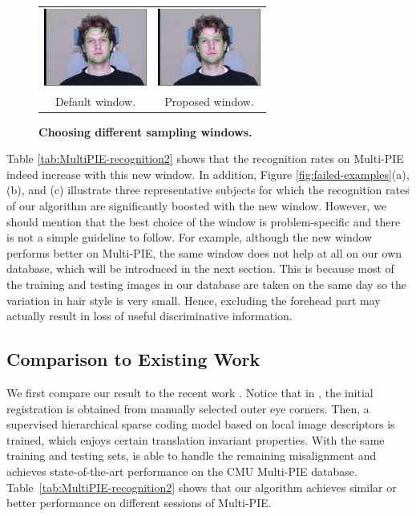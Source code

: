 \documentclass[10pt,journal,letterpaper,compsoc]{IEEEtran} %
\begin{document}
\begin{figure}
\vspace{-1em}
\centering
{\small
\begin{tabular}{@{}cc@{}}
\includegraphics[trim=1.9in .7in 1.9in .5in, clip, height=1.0in]{figures_pami/example.png} &
\includegraphics[trim=1.9in .7in 1.9in .5in, clip, height=1.0in]{figures_pami/example_new.png} \vspace{0mm} \\
Default window. & Proposed window. \vspace{0mm}
\end{tabular}
}
\caption{{\bf Choosing different sampling windows.}}
\label{fig:new-mask}
\vspace{-1em}
\end{figure}

Table \ref{tab:MultiPIE-recognition2} shows that the
recognition rates on Multi-PIE indeed increase with this new
window. In addition, Figure \ref{fig:failed-examples}(a), (b),
and (c) illustrate three representative subjects for which the
recognition rates of our algorithm are significantly boosted
with the new window. However, we should mention that the best
choice of the window is problem-specific and there is not a
simple guideline to follow. For example, although the new
window performs better on Multi-PIE, the same window does not
help at all on our own database, which will be introduced in
the next section. This is because most of the training and
testing images in our database are taken on the same day so the
variation in hair style is very small. Hence, excluding the
forehead part may actually result in loss of useful
discriminative information.

\subsection{Comparison to Existing Work}
We first compare our result to the recent work
\cite{Yang2010-CVPR}. Notice that in \cite{Yang2010-CVPR}, the
initial registration is obtained from manually selected outer
eye corners. Then, a supervised hierarchical sparse coding
model based on local image descriptors is trained, which enjoys
certain translation invariant properties. With the same
training and testing sets, \cite{Yang2010-CVPR} is able to
handle the remaining misalignment and achieves state-of-the-art
performance on the CMU Multi-PIE database.
Table~\ref{tab:MultiPIE-recognition2} shows that our algorithm
achieves similar or better performance on different sessions of
Multi-PIE.
\end{document}
